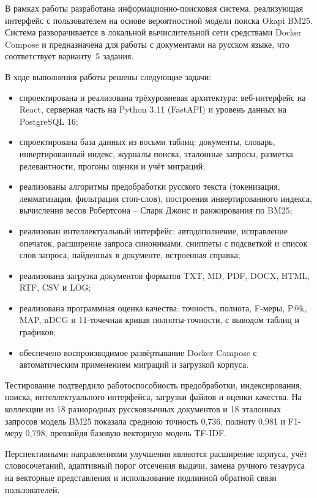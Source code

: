
В рамках работы разработана информационно-поисковая система, реализующая интерфейс с пользователем на основе вероятностной модели поиска Okapi BM25. Система разворачивается в локальной вычислительной сети средствами Docker Compose и предназначена для работы с документами на русском языке, что соответствует варианту~5 задания.

В ходе выполнения работы решены следующие задачи:

\begin{itemize}
	\item спроектирована и реализована трёхуровневая архитектура: веб-интерфейс на React, серверная часть на Python 3.11 (FastAPI) и уровень данных на PostgreSQL 16;
	\item спроектирована база данных из восьми таблиц: документы, словарь, инвертированный индекс, журналы поиска, эталонные запросы, разметка релевантности, прогоны оценки и учёт миграций;
	\item реализованы алгоритмы предобработки русского текста (токенизация, лемматизация, фильтрация стоп-слов), построения инвертированного индекса, вычисления весов Робертсона -- Спарк Джонс и ранжирования по BM25;
	\item реализован интеллектуальный интерфейс: автодополнение, исправление опечаток, расширение запроса синонимами, сниппеты с подсветкой и список слов запроса, найденных в документе, встроенная справка;
	\item реализована загрузка документов форматов TXT, MD, PDF, DOCX, HTML, RTF, CSV и LOG;
	\item реализована программная оценка качества: точность, полнота, F-меры, P@k, MAP, nDCG и 11-точечная кривая полноты-точности, с выводом таблиц и графиков;
	\item обеспечено воспроизводимое развёртывание Docker Compose с автоматическим применением миграций и загрузкой корпуса.
\end{itemize}

Тестирование подтвердило работоспособность предобработки, индексирования, поиска, интеллектуального интерфейса, загрузки файлов и оценки качества. На коллекции из 18 разнородных русскоязычных документов и 18 эталонных запросов модель BM25 показала среднюю точность 0,736, полноту 0,981 и F1-меру 0,798, превзойдя базовую векторную модель TF-IDF.

Перспективными направлениями улучшения являются расширение корпуса, учёт словосочетаний, адаптивный порог отсечения выдачи, замена ручного тезауруса на векторные представления и использование подлинной обратной связи пользователей.

